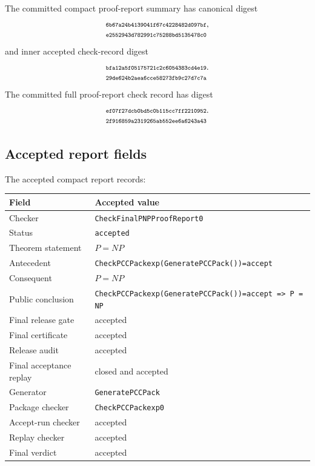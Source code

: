 \documentclass[10.5pt,a4paper]{article}
\makeatletter
\newcommand{\hashpair}[2]{\begin{tabular}[t]{@{}l@{}}\texttt{\scriptsize #1}\\\texttt{\scriptsize #2}\end{tabular}}
\makeatother
\begin{document}
The committed compact proof-report summary has canonical digest
\[
\hashpair{6b67a24b4139041f67c4228482d097bf}{e2552943d782991c75288bd5135478c0},
\]
and inner accepted check-record digest
\[
\hashpair{bfa12a5f05175721c2c6054383cd4e19}{29de624b2aea6cce58273fb9c27d7c7a}.
\]
The committed full proof-report check record has digest
\[
\hashpair{ef07f27dcb0bd5c0b115cc7ff2210952}{2f916859a2319265ab552ee6a6243a43}.
\]

\subsection{Accepted report fields}
The accepted compact report records:
\begin{longtable}{>{\raggedright\arraybackslash}p{}p{}}
\toprule
Field & Accepted value\\
\midrule
Checker & \texttt{CheckFinalPNPProofReport0}\\
Status & \texttt{accepted}\\
Theorem statement & \(P=NP\)\\
Antecedent & \texttt{CheckPCCPackexp(GeneratePCCPack())=accept}\\
Consequent & \(P=NP\)\\
Public conclusion & \texttt{CheckPCCPackexp(GeneratePCCPack())=accept => P = NP}\\
Final release gate & accepted\\
Final certificate & accepted\\
Release audit & accepted\\
Final acceptance replay & closed and accepted\\
Generator & \texttt{GeneratePCCPack}\\
Package checker & \texttt{CheckPCCPackexp0}\\
Accept-run checker & accepted\\
Replay checker & accepted\\
Final verdict & accepted\\
\bottomrule
\end{longtable}
\end{document}
